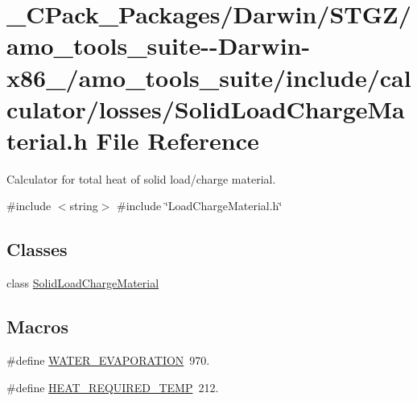 \hypertarget{___c_pack___packages_2_darwin_2_s_t_g_z_2amo__tools__suite--_darwin-x86__64_2amo__tools__suite_24924830b9aa131be7fc658c83ea6c4c5}{}\section{\+\_\+\+C\+Pack\+\_\+\+Packages/\+Darwin/\+S\+T\+G\+Z/amo\+\_\+tools\+\_\+suite-\/-\/\+Darwin-\/x86\+\_/amo\+\_\+tools\+\_\+suite/include/calculator/losses/\+Solid\+Load\+Charge\+Material.h File Reference}
\label{___c_pack___packages_2_darwin_2_s_t_g_z_2amo__tools__suite--_darwin-x86__64_2amo__tools__suite_24924830b9aa131be7fc658c83ea6c4c5}


Calculator for total heat of solid load/charge material.  


{\ttfamily \#include $<$string$>$}\newline
{\ttfamily \#include \char`\"{}Load\+Charge\+Material.\+h\char`\"{}}\newline
\subsection*{Classes}
\begin{DoxyCompactItemize}
\item 
class \hyperlink{class_solid_load_charge_material}{Solid\+Load\+Charge\+Material}
\end{DoxyCompactItemize}
\subsection*{Macros}
\begin{DoxyCompactItemize}
\item 
\#define \hyperlink{___c_pack___packages_2_darwin_2_s_t_g_z_2amo__tools__suite--_darwin-x86__64_2amo__tools__suite_24924830b9aa131be7fc658c83ea6c4c5_ae92c28c36ccc6a7547c7ed8bd1581061}{W\+A\+T\+E\+R\+\_\+\+E\+V\+A\+P\+O\+R\+A\+T\+I\+ON}~970.
\item 
\#define \hyperlink{___c_pack___packages_2_darwin_2_s_t_g_z_2amo__tools__suite--_darwin-x86__64_2amo__tools__suite_24924830b9aa131be7fc658c83ea6c4c5_abbae40352256c3d78028259f5192d4da}{H\+E\+A\+T\+\_\+\+R\+E\+Q\+U\+I\+R\+E\+D\+\_\+\+T\+E\+MP}~212.
\end{DoxyCompactItemize}


